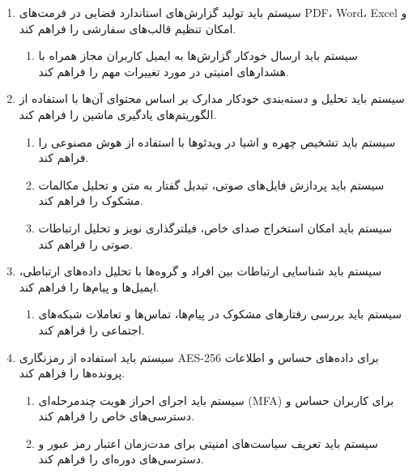 \documentclass[12pt,a4paper,oneside]{article}
\begin{document}
\begin{itemize}
\begin{enumerate}
            \item 
            سیستم باید تولید گزارش‌های استاندارد قضایی در فرمت‌های PDF، Word، Excel و امکان تنظیم قالب‌های سفارشی را فراهم کند.
            \begin{enumerate}
                \renewcommand{\labelenumii}{{\rl{\arabic{enumii}.\arabic{enumi}}}R-}
                \item 
                سیستم باید ارسال خودکار گزارش‌ها به ایمیل کاربران مجاز همراه با هشدارهای امنیتی در مورد تغییرات مهم را فراهم کند.
            \end{enumerate}
    
            \item 
            سیستم باید تحلیل و دسته‌بندی خودکار مدارک بر اساس محتوای آن‌ها با استفاده از الگوریتم‌های یادگیری ماشین را فراهم کند.
            \begin{enumerate}
                \renewcommand{\labelenumii}{{\rl{\arabic{enumii}.\arabic{enumi}}}R-}
                \item 
                سیستم باید تشخیص چهره و اشیا در ویدئوها با استفاده از هوش مصنوعی را فراهم کند.
                \item 
                سیستم باید پردازش فایل‌های صوتی، تبدیل گفتار به متن و تحلیل مکالمات مشکوک را فراهم کند.
                \item 
                سیستم باید امکان استخراج صدای خاص، فیلترگذاری نویز و تحلیل ارتباطات صوتی را فراهم کند.
            \end{enumerate}
    
            \item 
            سیستم باید شناسایی ارتباطات بین افراد و گروه‌ها با تحلیل داده‌های ارتباطی، ایمیل‌ها و پیام‌ها را فراهم کند.
            \begin{enumerate}
                \renewcommand{\labelenumii}{{\rl{\arabic{enumii}.\arabic{enumi}}}R-}
                \item 
                سیستم باید بررسی رفتارهای مشکوک در پیام‌ها، تماس‌ها و تعاملات شبکه‌های اجتماعی را فراهم کند.
            \end{enumerate}
    
            \item 
            سیستم باید استفاده از رمزنگاری AES-256 برای داده‌های حساس و اطلاعات پرونده‌ها را فراهم کند.
            \begin{enumerate}
                \renewcommand{\labelenumii}{{\rl{\arabic{enumii}.\arabic{enumi}}}R-}
                \item 
                سیستم باید اجرای احراز هویت چندمرحله‌ای (MFA) برای کاربران حساس و دسترسی‌های خاص را فراهم کند.
                \item 
                سیستم باید تعریف سیاست‌های امنیتی برای مدت‌زمان اعتبار رمز عبور و دسترسی‌های دوره‌ای را فراهم کند.
            \end{enumerate}
    

\end{enumerate}
\end{itemize}
\end{document}
